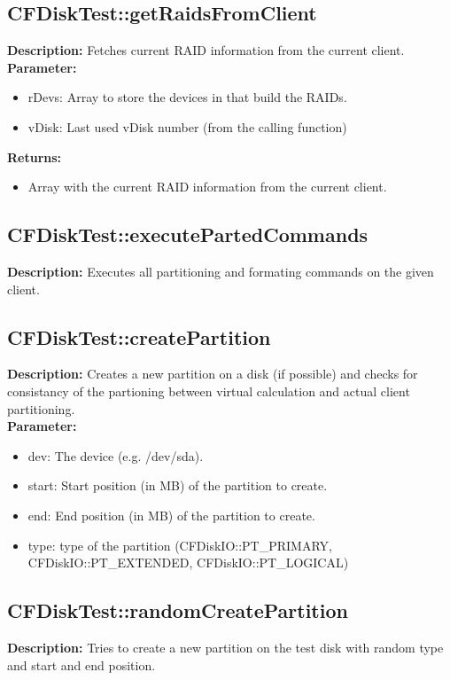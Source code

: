 \subsection{CFDiskTest::getRaidsFromClient}
\textbf{Description:} Fetches current RAID information from the current client.\\
\textbf{Parameter:}
\begin{itemize}
\item rDevs: Array to store the devices in that build the RAIDs.
\item vDisk: Last used vDisk number (from the calling function)
\end{itemize}
\textbf{Returns:}
\begin{itemize}
\item Array with the current RAID information from the current client.
\end{itemize}

\subsection{CFDiskTest::executePartedCommands}
\textbf{Description:} Executes all  partitioning and formating commands on the given client.\\

\subsection{CFDiskTest::createPartition}
\textbf{Description:} Creates a new partition on a disk (if possible) and checks for consistancy of the partioning between virtual calculation and actual client partitioning.\\
\textbf{Parameter:}
\begin{itemize}
\item dev: The device (e.g. /dev/sda).
\item start: Start position (in MB) of the partition to create.
\item end: End position (in MB) of the partition to create.
\item type: type of the partition (CFDiskIO::PT\_PRIMARY, CFDiskIO::PT\_EXTENDED, CFDiskIO::PT\_LOGICAL)
\end{itemize}

\subsection{CFDiskTest::randomCreatePartition}
\textbf{Description:} Tries to create a new partition on the test disk with random type and start and end position.\\


